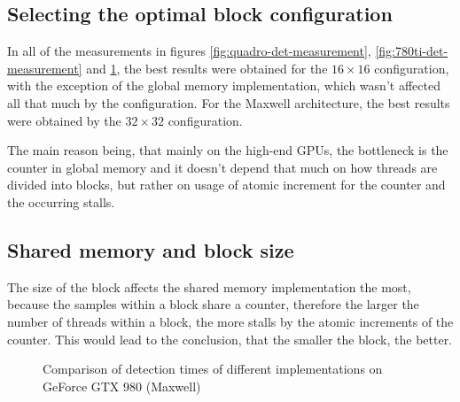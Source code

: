 \subsection{Selecting the optimal block configuration}\label{subsec:block-config}

In all of the measurements in figures \ref{fig:quadro-det-measurement}, \ref{fig:780ti-det-measurement} and \ref{fig:980-det-measurement}, the best results were obtained for the $16 \times 16$ configuration, with the exception of the global memory implementation, which wasn't affected all that much by the configuration. For the Maxwell architecture, the best results were obtained by the $32 \times 32$ configuration.

The main reason being, that mainly on the high-end GPUs, the bottleneck is the counter in global memory and it doesn't depend that much on how threads are divided into blocks, but rather on usage of atomic increment for the counter and the occurring stalls.

\subsection{Shared memory and block size}

The size of the block affects the shared memory implementation the most, because the samples within a block share a counter, therefore the larger the number of threads within a block, the more stalls by the atomic increments of the counter. This would lead to the conclusion, that the smaller the block, the better.

\begin{figure}[ht]
\centering{}
	\caption{Comparison of detection times of different implementations on GeForce GTX 980 (Maxwell)}
	\label{fig:980-det-measurement}
\end{figure}

